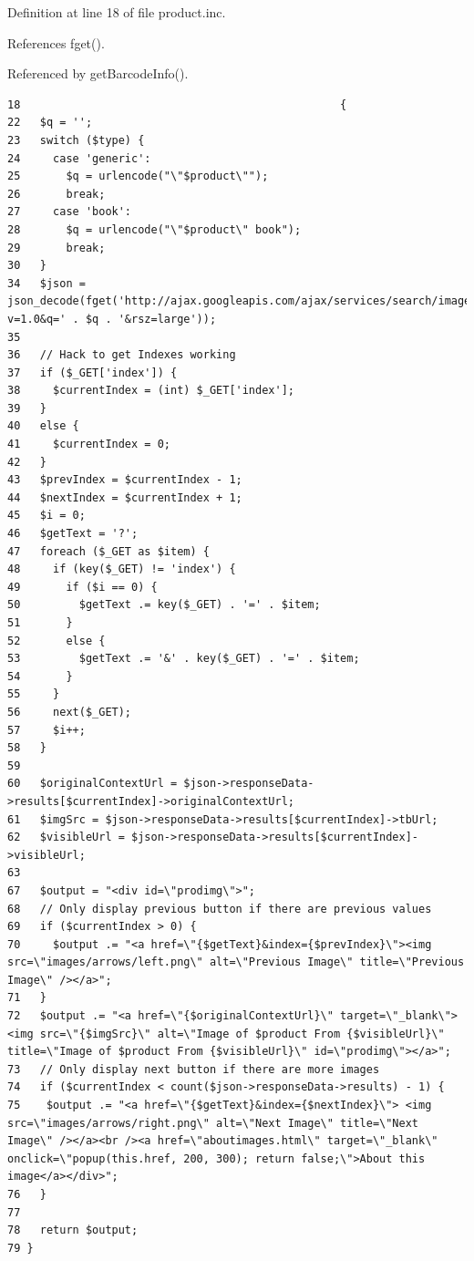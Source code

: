 Definition at line 18 of file product.inc.

References fget().

Referenced by getBarcodeInfo().

\begin{Code}\begin{verbatim}18                                                 {
22   $q = '';
23   switch ($type) {
24     case 'generic':
25       $q = urlencode("\"$product\"");
26       break;
27     case 'book':
28       $q = urlencode("\"$product\" book");
29       break;
30   }
34   $json = json_decode(fget('http://ajax.googleapis.com/ajax/services/search/images?v=1.0&q=' . $q . '&rsz=large'));
35 
36   // Hack to get Indexes working
37   if ($_GET['index']) {
38     $currentIndex = (int) $_GET['index'];
39   }
40   else {
41     $currentIndex = 0;
42   }
43   $prevIndex = $currentIndex - 1;
44   $nextIndex = $currentIndex + 1;
45   $i = 0;
46   $getText = '?';
47   foreach ($_GET as $item) {
48     if (key($_GET) != 'index') {
49       if ($i == 0) {
50         $getText .= key($_GET) . '=' . $item;
51       }
52       else {
53         $getText .= '&' . key($_GET) . '=' . $item;
54       }
55     }
56     next($_GET);
57     $i++;
58   }
59 
60   $originalContextUrl = $json->responseData->results[$currentIndex]->originalContextUrl;
61   $imgSrc = $json->responseData->results[$currentIndex]->tbUrl;
62   $visibleUrl = $json->responseData->results[$currentIndex]->visibleUrl;
63 
67   $output = "<div id=\"prodimg\">";
68   // Only display previous button if there are previous values
69   if ($currentIndex > 0) {
70     $output .= "<a href=\"{$getText}&index={$prevIndex}\"><img src=\"images/arrows/left.png\" alt=\"Previous Image\" title=\"Previous Image\" /></a>";
71   }
72   $output .= "<a href=\"{$originalContextUrl}\" target=\"_blank\"><img src=\"{$imgSrc}\" alt=\"Image of $product From {$visibleUrl}\" title=\"Image of $product From {$visibleUrl}\" id=\"prodimg\"></a>";
73   // Only display next button if there are more images
74   if ($currentIndex < count($json->responseData->results) - 1) {
75    $output .= "<a href=\"{$getText}&index={$nextIndex}\"> <img src=\"images/arrows/right.png\" alt=\"Next Image\" title=\"Next Image\" /></a><br /><a href=\"aboutimages.html\" target=\"_blank\" onclick=\"popup(this.href, 200, 300); return false;\">About this image</a></div>";
76   }
77 
78   return $output;
79 }
\end{verbatim}
\end{Code}




